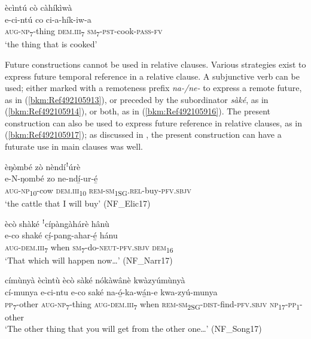 \ex
ècìntú cò càhíkìwà\\
\gll e-ci-ntú    co    ci-a-hík-iw-a\\
\textsc{aug}-\textsc{np}\textsubscript{7}-thing  \textsc{dem}.\textsc{iii}\textsubscript{7}  \textsc{sm}\textsubscript{7}-\textsc{pst}-cook-\textsc{pass}-\textsc{fv}\\
\glt ‘the thing that is cooked’
\z
\z

Future constructions cannot be used in relative clauses. Various strategies exist to express future temporal reference in a relative clause. A subjunctive verb can be used; either marked with a remoteness prefix \textit{na-/ne-} to express a remote future, as in (\ref{bkm:Ref492105913}), or preceded by the subordinator \textit{sàké}, as in (\ref{bkm:Ref492105914}), or both, as in (\ref{bkm:Ref492105916}). The present construction can also be used to express future reference in relative clauses, as in (\ref{bkm:Ref492105917}); as discussed in , the present construction can have a futurate use in main clauses was well.

\ea
\label{bkm:Ref492105913}
èŋòmbé zò nèndíꜝúrè\\
\gll e-N-ŋombé    zo    ne-ndí̲-ur-é̲\\
\textsc{aug}-\textsc{np}\textsubscript{10}-cow  \textsc{dem}.\textsc{iii}\textsubscript{10}  \textsc{rem}-\textsc{sm}\textsubscript{1SG}.\textsc{rel}-buy-\textsc{pfv}.\textsc{sbjv}\\
\glt ‘the cattle that I will buy’ (NF\_Elic17)
\z

\ea
\label{bkm:Ref492105914}
ècò shàké ꜝcípàngàhárè hânù\\
\gll e-co    shaké  cí̲-pang-ahar-é̲    hánu\\
\textsc{aug}-\textsc{dem}.\textsc{iii}\textsubscript{7}  when  \textsc{sm}\textsubscript{7}-do-\textsc{neut}-\textsc{pfv}.\textsc{sbjv}  \textsc{dem}\textsubscript{16}\\
\glt ‘That which will happen now…’ (NF\_Narr17)
\z

\ea
\label{bkm:Ref492105916}
címùnyà ècìntù ècò sàké nókàwânè kwàzyúmùnyà\\
\gll cí-munya  e-ci-ntu  e-co    saké  na-ó̲-ka-wá̲n-e      kwa-zyú-munya\\
\textsc{pp}\textsubscript{7}-other  \textsc{aug}-\textsc{np}\textsubscript{7}-thing
\textsc{aug}-\textsc{dem}.\textsc{iii}\textsubscript{7}  when  \textsc{rem}-\textsc{sm}\textsubscript{2SG}-\textsc{dist}-find-\textsc{pfv}.\textsc{sbjv}  \textsc{np}\textsubscript{17}-\textsc{pp}\textsubscript{1}-other\\
\glt ‘The other thing that you will get from the other one…’ (NF\_Song17)
\z

